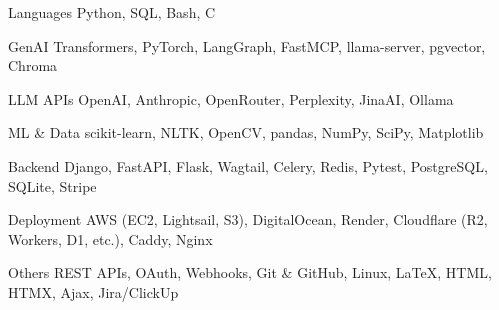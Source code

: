 


\begin{cvskills}

\cvskill
    {Languages} %
    {Python, SQL, Bash, C} %

\cvskill
    {GenAI} %
    {Transformers, PyTorch, LangGraph, FastMCP, llama-server, pgvector, Chroma} %

\cvskill
    {LLM APIs} %
    {OpenAI, Anthropic, OpenRouter, Perplexity, JinaAI, Ollama} %

\cvskill
    {ML \& Data} %
    {scikit-learn, NLTK, OpenCV, pandas, NumPy, SciPy, Matplotlib} %

\cvskill
    {Backend} %
    {Django, FastAPI, Flask, Wagtail, Celery, Redis, Pytest, PostgreSQL, SQLite, Stripe} %

\cvskill
    {Deployment} %
    {AWS (EC2, Lightsail, S3), DigitalOcean, Render, Cloudflare (R2, Workers, D1, etc.), Caddy, Nginx} %

\cvskill
    {Others} %
    {REST APIs, OAuth, Webhooks, Git \& GitHub, Linux, LaTeX, HTML, HTMX, Ajax, Jira/ClickUp} %

\end{cvskills}
